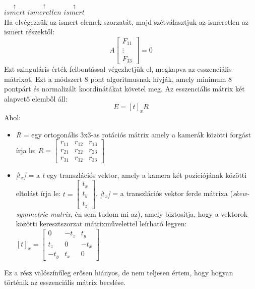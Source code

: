 \documentclass[12pt]{report}
\begin{document}
\begin{enumerate}
                        \hspace{3cm} $\overset{\uparrow}{ismert}$ \hspace{1cm} $\overset{\uparrow}{ismeretlen}$ \hspace{0.1cm} $\overset{\uparrow}{ismert}$\\
                    Ha elvégezzük az ismert elemek szorzatát, majd szétválasztjuk az ismeretlen az ismert részektől:
                    \[A\begin{bmatrix}F_{11}\\\vdots\\F_{33}\end{bmatrix} = 0\]
                    Ezt szinguláris érték felbontással végezhetjük el, megkapva az esszenciális mátrixot. Ezt a módszert 8 pont algoritmusnak hívják, amely minimum 8 pontpárt és normalizált koordinátákat követel meg.
                    Az esszenciális mátrix két alapvető elemből áll:
                    \[E = [t]_xR\]
                    Ahol:
                    \begin{itemize}
                        \item \textit{R} = egy ortogonális 3x3-as rotációs mátrix amely a kamerák közötti forgást írja le: $R = \begin{bmatrix}r_{11}&r_{12}&r_{13}\\r_{21}&r_{22}&r_{23}\\r_{31}&r_{32}&r_{33}\end{bmatrix}$
                        \item \textit{[$t_x$]} = a \textit{t} egy transzlációs vektor, amely a kamera két pozíciójának közötti eltolást írja le: $t = \begin{bmatrix}t_x\\t_y\\t_z\end{bmatrix}$. \textit{[$t_x$]} = a transzlációs vektor ferde mátrixa (\textit{skew-symmetric matrix}, én sem tudom mi az), amely biztosítja, hogy a vektorok közötti keresztszorzat mátrixművelettel leírható legyen: $[t]_x = \begin{bmatrix}0&-t_z&t_y\\t_z&0&-t_x\\-t_y&t_x&0\end{bmatrix}$\\
                    \end{itemize}
                    Ez a rész valószínűleg erősen hiányos, de nem teljesen értem, hogy hogyan történik az esszenciális mátrix becslése.\\

\end{enumerate}
\end{document}
